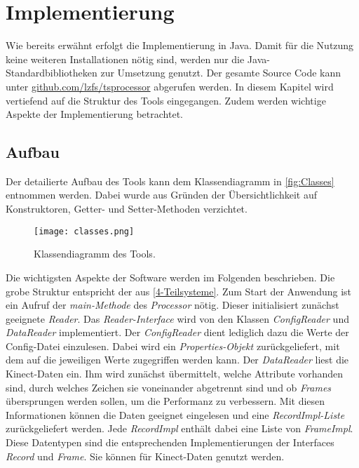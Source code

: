 \chapter{Implementierung}
\label{chapter5}
Wie bereits erwähnt erfolgt die Implementierung in Java.
Damit für die Nutzung keine weiteren Installationen nötig sind,
werden nur die Java-Standardbibliotheken zur Umsetzung genutzt.
Der gesamte Source Code kann unter \href{https://github.com/lzfs/tsprocessor}{github.com/lzfs/tsprocessor}
abgerufen werden.
In diesem Kapitel wird vertiefend auf die Struktur des Tools eingegangen.
Zudem werden wichtige Aspekte der Implementierung betrachtet.

\section{Aufbau}
\label{5-Aufbau}
Der detailierte Aufbau des Tools kann dem Klassendiagramm in \autoref{fig:Classes} entnommen werden.
Dabei wurde aus Gründen der Übersichtlichkeit auf Konstruktoren,
Getter- und Setter-Methoden verzichtet.
\begin{figure}[p]
    \begin{center}
        \texttt{[image: classes.png]}
    \end{center}
    \caption{Klassendiagramm des Tools.}
    \label{fig:Classes}
\end{figure}
Die wichtigsten Aspekte der Software werden im Folgenden beschrieben.
Die grobe Struktur entspricht der aus \autoref{4-Teilsysteme}.
Zum Start der Anwendung ist ein Aufruf der \emph{main-Methode} des \emph{Processor} nötig.
Dieser initialisiert zunächst geeignete \emph{Reader}.
Das \emph{Reader-Interface} wird von den Klassen \emph{ConfigReader} und \emph{DataReader} implementiert.
Der \emph{ConfigReader} dient lediglich dazu die Werte der Config-Datei einzulesen.
Dabei wird ein \emph{Properties-Objekt} zurückgeliefert,
mit dem auf die jeweiligen Werte zugegriffen werden kann.
Der \emph{DataReader} liest die Kinect-Daten ein.
Ihm wird zunächst übermittelt, welche Attribute vorhanden sind,
durch welches Zeichen sie voneinander abgetrennt sind
und ob \emph{Frames} übersprungen werden sollen,
um die Performanz zu verbessern.
Mit diesen Informationen können die Daten geeignet eingelesen und eine \emph{RecordImpl-Liste} zurückgeliefert werden.
Jede \emph{RecordImpl} enthält dabei eine Liste von \emph{FrameImpl}.
Diese Datentypen sind die entsprechenden Implementierungen der Interfaces \emph{Record} und \emph{Frame}.
Sie können für Kinect-Daten genutzt werden.
